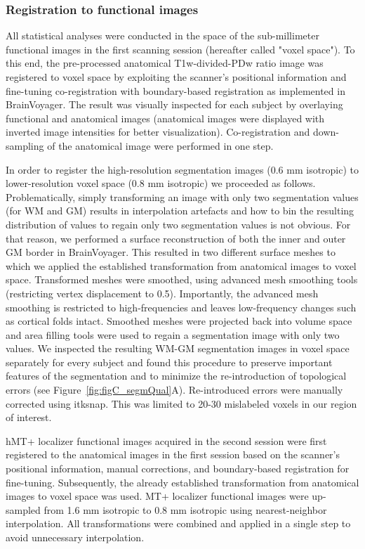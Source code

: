 \subsubsection{Registration to functional images}
All statistical analyses were conducted in the space of the sub-millimeter functional images in the first scanning session (hereafter called "voxel space"). To this end, the pre-processed anatomical T1w-divided-PDw ratio image was registered to voxel space by exploiting the scanner’s positional information and fine-tuning co-registration with boundary-based registration \parencite{Greve2009} as implemented in BrainVoyager. The result was visually inspected for each subject by overlaying functional and anatomical images (anatomical images were displayed with inverted image intensities for better visualization). Co-registration and down-sampling of the anatomical image were performed in one step.

In order to register the high-resolution segmentation images (0.6 mm isotropic) to lower-resolution voxel space (0.8 mm isotropic) we proceeded as follows. Problematically, simply transforming an image with only two segmentation values (for WM and GM) results in interpolation artefacts and how to bin the resulting distribution of values to regain only two segmentation values is not obvious. For that reason, we performed a surface reconstruction of both the inner and outer GM border in BrainVoyager. This resulted in two different surface meshes to which we applied the established transformation from anatomical images to voxel space. Transformed meshes were smoothed, using advanced mesh smoothing tools (restricting vertex displacement to 0.5). Importantly, the advanced mesh smoothing is restricted to high-frequencies and leaves low-frequency changes such as cortical folds intact. Smoothed meshes were projected back into volume space and area filling tools were used to regain a segmentation image with only two values. We inspected the resulting WM-GM segmentation images in voxel space separately for every subject and found this procedure to preserve important features of the segmentation and to minimize the re-introduction of topological errors (see Figure~\ref{fig:figC_segmQual}A). Re-introduced errors were manually corrected using itksnap. This was limited to 20-30 mislabeled voxels in our region of interest.

hMT+ localizer functional images acquired in the second session were first registered to the anatomical images in the first session based on the scanner’s positional information, manual corrections, and boundary-based registration \parencite{Greve2009} for fine-tuning. Subsequently, the already established transformation from anatomical images to voxel space was used. MT+ localizer functional images were up-sampled from 1.6 mm isotropic to 0.8 mm isotropic using nearest-neighbor interpolation. All transformations were combined and applied in a single step to avoid unnecessary interpolation.

